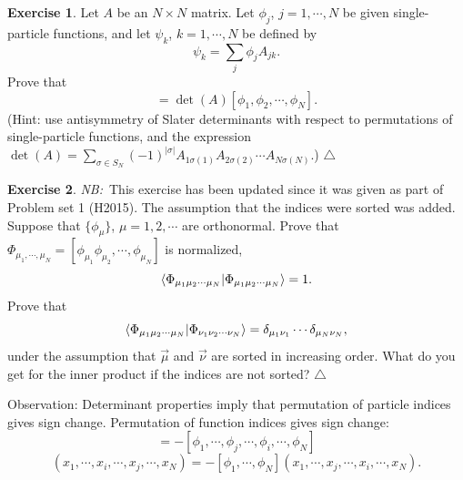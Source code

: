 \documentclass{report}
\theoremstyle{plain}
\theoremstyle{definition}
\newtheorem{exerc}{Exercise}[chapter]
\newcommand\xqed[1]{%
  \leavevmode\unskip\penalty9999 \hbox{}\nobreak\hfill
  \quad\hbox{#1}}
\newcommand\demo{\xqed{$\triangle$}}
\newenvironment{exercise}{\bigskip\begin{exerc}}{\demo\end{exerc}\bigskip}
\newcommand{\note}[1]{{\color{red}\emph{NB:}~#1}}
\begin{document}
\begin{exercise}\label{exercise:slater3}
   Let $A$ be an $N\times N$ matrix. Let $\phi_j$, $j=1,\cdots,N$ be
   given single-particle functions, and let $\psi_k$, $k=1,\cdots,N$ be
   defined by
   \begin{equation}
     \psi_k = \sum_j \phi_j A_{jk}.
   \end{equation}
   Prove that
   \begin{equation}
     [\psi_1,\psi_2,\cdots,\psi_N] =
     \det(A)[\phi_1,\phi_2,\cdots,\phi_N].
   \end{equation}
   (Hint: use antisymmetry of Slater determinants with respect to
   permutations of single-particle functions, and the expression
   $\det(A) = \sum_{\sigma\in S_N} (-1)^{|\sigma|}A_{1\sigma(1)}A_{2\sigma(2)}
   \cdots A_{N\sigma(N)}.$)
 \end{exercise}


\begin{exercise}\label{exercise:slater2}\note{This exercise has been
    updated since it was given as part of Problem set 1 (H2015). The
    assumption that the indices were sorted was added.}
  Suppose that $\{\phi_\mu\}$, $\mu=1,2,\cdots$ are orthonormal.  Prove
  that $\Phi_{\mu_1,\cdots,\mu_N} =
  [\phi_{\mu_1}\phi_{\mu_2},\cdots,\phi_{\mu_N}]$ is normalized,
  \[ \braket{\Phi_{{\mu_1\mu_2\cdots \mu_N}}|\Phi_{{\mu_1\mu_2\cdots \mu_N}}} = 1. \]
  Prove that
  \[ \braket{\Phi_{\mu_1\mu_2\cdots
      \mu_N}|\Phi_{\nu_1\nu_2\cdots\nu_N}} = \delta_{\mu_1\nu_1}\cdots
  \delta_{\mu_N\nu_N}, \]
  under the assumption that $\vec{\mu}$ and $\vec{\nu}$ are sorted in
  increasing order. What do you get for the inner product if the indices are not sorted?
\end{exercise}



Observation: Determinant properties imply that permutation of particle
indices gives sign change. Permutation of function indices gives
sign change:
\begin{equation}
  [\phi_1,\cdots,\phi_i,\cdots,\phi_j,\cdots,\phi_N] =
  -[\phi_1,\cdots,\phi_j,\cdots,\phi_i,\cdots,\phi_N]
\end{equation}
\begin{equation}
  [\phi_1,\cdots,\phi_N](x_1,\cdots,x_i,\cdots,x_j,\cdots,x_N) =
  -[\phi_1,\cdots,\phi_N](x_1,\cdots,x_j,\cdots,x_i,\cdots,x_N). 
\end{equation}
\end{document}
